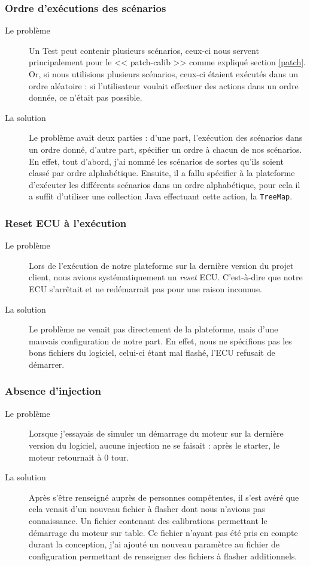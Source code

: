 	\subsubsection{Ordre d'exécutions des scénarios}
		\begin{description}
			\item[Le problème] Un Test peut contenir plusieurs scénarios, ceux-ci nous servent principalement pour le << patch-calib >> comme expliqué section \ref{patch}. Or, si nous utilisions plusieurs scénarios, ceux-ci étaient exécutés dans un ordre aléatoire : si l'utilisateur voulait effectuer des actions dans un ordre donnée, ce n'était pas possible.
			\item[La solution] Le problème avait deux parties : d'une part, l'exécution des scénarios dans un ordre donné, d'autre part, spécifier un ordre à chacun de nos scénarios. En effet, tout d'abord, j'ai nommé les scénarios de sortes qu'ils soient classé par ordre alphabétique. Ensuite, il a fallu spécifier à la plateforme d'exécuter les différents scénarios dans un ordre alphabétique, pour cela il a suffit d'utiliser une collection Java effectuant cette action, la \texttt{TreeMap}.
	\end{description}
	
	\subsubsection{Reset ECU à l'exécution}
	\begin{description}
		\item[Le problème] Lors de l'exécution de notre plateforme sur la dernière version du projet client, nous avions systématiquement un \textit{reset} ECU. C'est-à-dire que notre ECU s'arrêtait et ne redémarrait pas pour une raison inconnue.
		\item[La solution] Le problème ne venait pas directement de la plateforme, mais d'une mauvais configuration de notre part. En effet, nous ne spécifions pas les bons fichiers du logiciel, celui-ci étant mal flashé, l'ECU refusait de démarrer.
	\end{description}
	
	\subsubsection{Absence d'injection}
	\begin{description}
		\item[Le problème] Lorsque j'essayais de simuler un démarrage du moteur sur la dernière version du logiciel, aucune injection ne se faisait : après le starter, le moteur retournait à 0 tour.
		\item[La solution] Après s'être renseigné auprès de personnes compétentes, il s'est avéré que cela venait d'un nouveau fichier à flasher dont nous n'avions pas connaissance. Un fichier contenant des calibrations permettant le démarrage du moteur sur table. Ce fichier n'ayant pas été pris en compte durant la conception, j'ai ajouté un nouveau paramètre au fichier de configuration permettant de renseigner des fichiers à flasher additionnels.
	\end{description}
	
